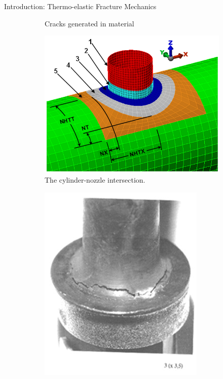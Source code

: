 \documentclass{beamer}
\begin{document}
\begin{frame}[t,fragile]{Introduction: Thermo-elastic Fracture Mechanics}
\begin{itemize}
\begin{figure}[H]
\begin{subfigure}{0.45\textwidth}
 \vspace{-.2cm}
 \caption{\tiny Cracks generated in material}
 \end{subfigure}
       \vspace{-.3cm}
      \begin{subfigure}{0.45\textwidth}
    \centering
   \includegraphics[scale=.1]{cyl.png}
 \vspace{-.2cm}
 \caption{\tiny{The cylinder-nozzle intersection.}}
 \label{cyl}
 \end{subfigure}
\begin{subfigure}{0.45\textwidth}
    \centering
   \includegraphics[scale=.1]{fail.jpg}
 \vspace{-.2cm}

\end{subfigure}
\end{figure}
\end{itemize}
\end{frame}
\end{document}
